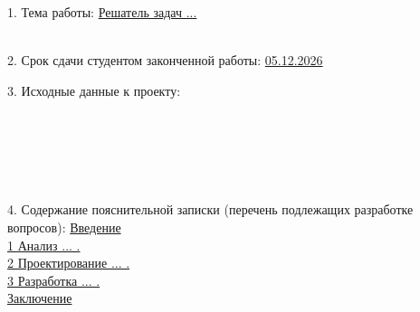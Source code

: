 {\begin{center}
  \end{center}

  1. Тема работы: \uline{Решатель задач ...}\lineunderscore\\
  \lineunderscore\\
  \vspace{1em}

  2. Срок сдачи студентом законченной работы: \uline{05.12.2026}\lineunderscore

  \vspace{1em}

  3. Исходные данные к проекту: 
  \lineunderscore\\
  \lineunderscore\\
  \lineunderscore\\
  \lineunderscore\\
  \lineunderscore\\
  \lineunderscore\\
  \lineunderscore

  \vspace{1em}

  4. Содержание пояснительной записки (перечень подлежащих разработке вопросов):
  \uline{\hspace*{2ex}Введение}\lineunderscore\\
  \uline{\hspace*{2ex}1 Анализ ... .}\lineunderscore\\
  \uline{\hspace*{2ex}2 Проектирование ... .}\lineunderscore\\
  \uline{\hspace*{2ex}3 Разработка ... .}\lineunderscore\\
  \uline{\hspace*{2ex}Заключение}\lineunderscore\\
  \lineunderscore\\
  \lineunderscore\\
  \lineunderscore\\
  \lineunderscore\\
  \lineunderscore\\
  \lineunderscore\\
  \lineunderscore

}
